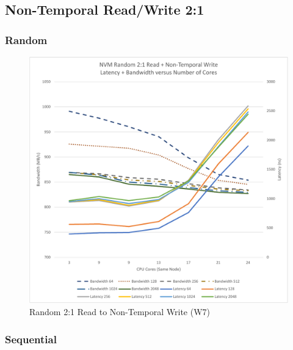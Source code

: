 \subsection{Non-Temporal Read/Write 2:1}

\subsubsection{Random}

\begin{figure}
    \centering
    \caption{Random 2:1 Read to Non-Temporal Write (W7)}\label{chart:random:W7}
    \includegraphics[scale=0.5]{charts/random-w7-crop.pdf}
\end{figure}

\subsubsection{Sequential}


